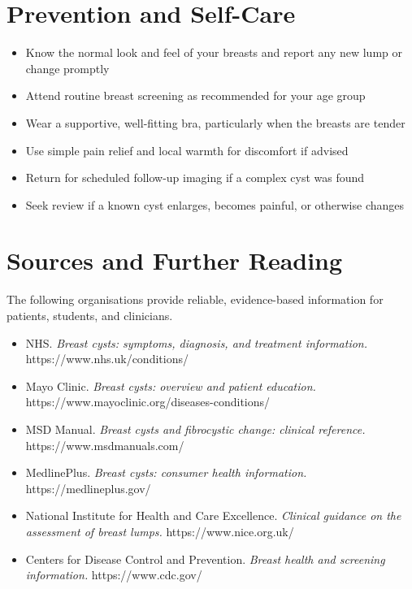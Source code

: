 \section*{Prevention and Self-Care}
\begin{itemize}
    \item Know the normal look and feel of your breasts and report any new lump or change promptly
    \item Attend routine breast screening as recommended for your age group
    \item Wear a supportive, well-fitting bra, particularly when the breasts are tender
    \item Use simple pain relief and local warmth for discomfort if advised
    \item Return for scheduled follow-up imaging if a complex cyst was found
    \item Seek review if a known cyst enlarges, becomes painful, or otherwise changes
\end{itemize}

\section*{Sources and Further Reading}
The following organisations provide reliable, evidence-based information for patients, students, and clinicians.

\begin{itemize}
    \item NHS. \textit{Breast cysts: symptoms, diagnosis, and treatment information.} https://www.nhs.uk/conditions/
    \item Mayo Clinic. \textit{Breast cysts: overview and patient education.} https://www.mayoclinic.org/diseases-conditions/
    \item MSD Manual. \textit{Breast cysts and fibrocystic change: clinical reference.} https://www.msdmanuals.com/
    \item MedlinePlus. \textit{Breast cysts: consumer health information.} https://medlineplus.gov/
    \item National Institute for Health and Care Excellence. \textit{Clinical guidance on the assessment of breast lumps.} https://www.nice.org.uk/
    \item Centers for Disease Control and Prevention. \textit{Breast health and screening information.} https://www.cdc.gov/
\end{itemize}
